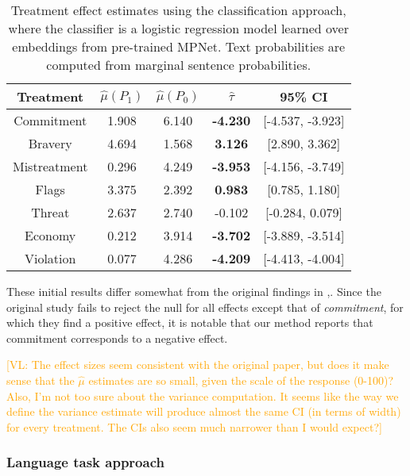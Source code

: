 \documentclass{article}
\newcommand{\vl}[1]{\textcolor{orange}{[VL: #1]}}
\begin{document}
\begin{table}[!ht]
    \centering
    \begin{tabular}{c|cccc}
        \toprule
        Treatment & $\hat{\mu}(P_1)$ & $\hat{\mu}(P_0)$ & $\hat{\tau}$ & 95\% CI \\
        \midrule
        Commitment & 1.908 & 6.140 & \textcolor{red!80!black}{\textbf{-4.230}} & [-4.537, -3.923] \\
        Bravery & 4.694 & 1.568 & \textcolor{green!50!black}{\textbf{3.126}} & [2.890, 3.362] \\
        Mistreatment & 0.296 & 4.249 & \textcolor{red!80!black}{\textbf{-3.953}} & [-4.156, -3.749] \\
        Flags & 3.375 & 2.392 & \textcolor{green!50!black}{\textbf{0.983}} & [0.785, 1.180] \\
        Threat & 2.637 & 2.740 & -0.102 & [-0.284, 0.079] \\
        Economy & 0.212 & 3.914 & \textcolor{red!80!black}{\textbf{-3.702}} & [-3.889, -3.514] \\
        Violation & 0.077 & 4.286 & \textcolor{red!80!black}{\textbf{-4.209}} & [-4.413, -4.004] \\
        \bottomrule
    \end{tabular}
    \caption{Treatment effect estimates using the classification approach, where the classifier is a logistic regression model learned over embeddings from pre-trained MPNet. Text probabilities are computed from marginal sentence probabilities.}
    \label{tab:results_clf2}
\end{table}

These initial results differ somewhat from the original findings in \cite{fong2021causal},. Since the original study fails to reject the null for all effects except that of \textit{commitment}, for which they find a positive effect, it is notable that our method reports that commitment corresponds to a negative effect.

\vl{The effect sizes seem consistent with the original paper, but does it make sense that the $\hat{\mu}$ estimates are so small, given the scale of the response (0-100)?
\newline \newline
Also, I'm not too sure about the variance computation. It seems like the way we define the variance estimate will produce almost the same CI (in terms of width) for every treatment. The CIs also seem much narrower than I would expect?}

\subsubsection{Language task approach}
\end{document}
